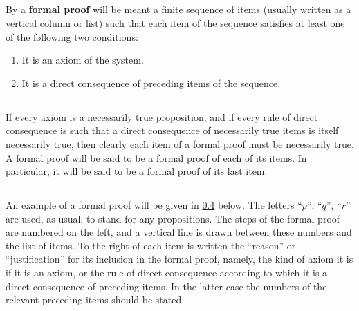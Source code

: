 \documentclass{book}
\let\oldmarginpar\marginpar
\renewcommand*{\marginpar}[1]{\oldmarginpar{\footnotesize#1}}
\begin{document}
\subsection{}
\label{sec:4.3}

By a \textbf{formal proof} will be meant a finite sequence of items (usually written as a vertical column or list) such that each item of the sequence satisfies at least one of the following two conditions:
\begin{enumerate}[resume*,start=1]
\item It is an axiom of the system.
\item It is a direct consequence of preceding items of the sequence.
\end{enumerate}

\subsection{}
\label{sec:4.4}

If every axiom is a necessarily true proposition, and if every rule of direct consequence is such that a direct consequence of necessarily true items is itself necessarily true, then clearly each item of a formal proof must be necessarily true.  A formal proof will be said to be a formal proof of each of its items.  In particular, it will be said to be a formal proof of its last item.

\subsection{}
\label{sec:4.5}

An example of a formal proof will be given in \ref{sec:4.6} below.  The letters “\(p\)”, “\(q\)”, “\(r\)” are used, as usual, to stand for any propositions.  The steps of the formal proof are numbered on the left, and a vertical line is drawn between these numbers and the list of items.  To the right of each item is written the “reason” or “justification” for its inclusion in the formal proof, namely, the kind of axiom it is if it is \marginpar{14}an axiom, or the rule of direct consequence according to which it is a direct consequence of preceding items.  In the latter case the numbers of the relevant preceding items should be stated.

\subsection{}
\label{sec:4.6}
\end{document}
